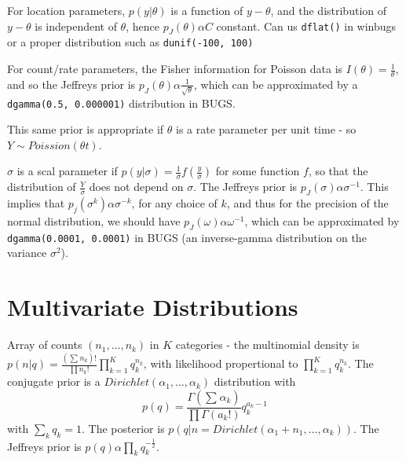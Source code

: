 \begin{defn}
  \label{sec:prior-distributions-4}
  For location parameters, $p(y|\theta)$ is a function of $y -
  \theta$, and the distribution of $y - \theta$ is independent of
  $\theta$, hence $p_{J}(\theta) \alpha C$ constant. Can us
  \texttt{dflat()} in winbugs or a proper distribution such as
  \texttt{dunif(-100, 100)}
\end{defn}

\begin{defn}
  \label{sec:prior-distributions-5}
  For count/rate parameters, the Fisher information for Poisson data
  is $I(\theta) = \frac{1}{\theta}$, and so the Jeffreys prior is
  $p_{J}(\theta) \alpha \frac{1}{\sqrt{\theta}}$, which can be
  approximated by a \texttt{dgamma(0.5, 0.000001)} distribution in
  BUGS.

  This same prior is appropriate if $\theta$ is a rate parameter per
  unit time - so $Y \sim Poission(\theta t)$.
\end{defn}

\begin{defn}
  \label{sec:prior-distributions-6}
  $\sigma$ is a scal parameter if $p(y | \sigma) = \frac{1}{\sigma}
  f(\frac{y}{\sigma})$ for some function $f$, so that the distribution
  of $\frac{Y}{\sigma} $ does not depend on $\sigma$. The Jeffreys
  prior is $p_{J}(\sigma) \alpha \sigma^{-1}$. This implies that
  $p_{j}(\sigma^{k}) \alpha \sigma^{-k}$, for any choice of $k$, and
  thus for the precision of the normal distribution, we should have
  $p_{J}(\omega) \alpha \omega^{-1}$, which can be approximated by
  \texttt{dgamma(0.0001, 0.0001)} in BUGS (an inverse-gamma
  distribution on the variance $\sigma^{2}$).
\end{defn}


\section{Multivariate Distributions}
\label{sec:mult-distr}

\begin{defn}
\label{sec:mult-distr-1}
  Array of counts $(n_{1}, \dots, n_{k})$ in $K$ categories - the
  multinomial density is $p(n|q) = \frac{(\sum_{}^{} n_{k})!}{\prod
    n_{k}!} \prod_{k=1}^{K} q_{k}^{n_{k}}$, with likelihood
  propertional to $\prod_{k=1}^{K} q_{k}^{n_{k}}$. The conjugate prior
  is a $Dirichlet(\alpha_{1}, \dots, \alpha_{k})$ distribution with
  \begin{equation}
    \label{eq:15}
    p(q) = \frac{\Gamma(\sum_{}^{} \alpha_{k})}{\prod \Gamma(a_{k}!)}
    q_{k}^{a_{k} - 1}
  \end{equation}  with $\sum_{k}^{} q_{k} = 1$.  The posterior is $p(q|n
  = Dirichlet(\alpha_{1} + n_{1}, \dots, \alpha_{k}))$.  The Jeffreys
  prior is $p(q) \alpha \prod_{k} q_{k}^{-\frac{1}{2}}$.
\end{defn}

